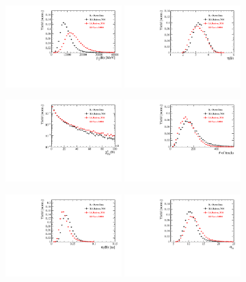 \begin{figure}[h]
\centering
\includegraphics[height=!,width=0.4\textwidth]{figs/dataVsMC/trigger_norm/Ds2all_Bs_PT.pdf}
\includegraphics[height=!,width=0.4\textwidth]{figs/dataVsMC/trigger_norm/Ds2all_Bs_ETA.pdf}

\includegraphics[height=!,width=0.4\textwidth]{figs/dataVsMC/trigger_norm/Ds2all_Bs_FDCHI2_OWNPV.pdf}
\includegraphics[height=!,width=0.4\textwidth]{figs/dataVsMC/trigger_norm/Ds2all_NTracks.pdf}

\includegraphics[height=!,width=0.4\textwidth]{figs/dataVsMC/trigger_norm/Ds2all_Bs_DTF_TAUERR.pdf}
\includegraphics[height=!,width=0.4\textwidth]{figs/dataVsMC/trigger_norm/Ds2all_Bs_DTF_MERR.pdf}


\end{figure}
